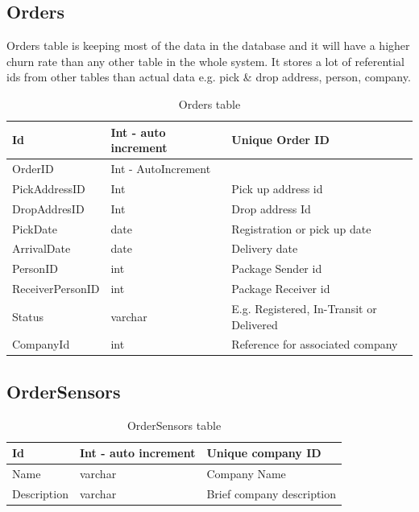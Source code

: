\subsection{Orders}
Orders table is keeping most of the data in the database and it will have a higher churn rate than any other table in the whole system. It stores a lot of referential ids from other tables than actual data e.g. pick \& drop address, person, company. 

\begin{table}[!ht]
\begin{center}
\begin{tabular}{ |l|l|l| } 
 \hline
Id & Int - auto increment & Unique Order ID \\
 \hline

OrderID & Int - AutoIncrement  & \\
\hline
PickAddressID & Int & Pick up address id\\
\hline
DropAddresID  & Int  & Drop address Id\\
\hline
PickDate  & date & Registration or pick up date\\
\hline
ArrivalDate & date & Delivery date\\
\hline
PersonID & int & Package Sender id\\
\hline
ReceiverPersonID & int & Package Receiver id\\
\hline
Status & varchar & E.g. Registered, In-Transit or Delivered\\
\hline
CompanyId & int & Reference for associated company\\

 \hline
\end{tabular}
\end{center}
    \caption{Orders table}
\end{table}

\subsection{OrderSensors}
\begin{table}[!ht]
\begin{center}
\begin{tabular}{ |l|l|l| } 
 \hline
Id & Int - auto increment & Unique company ID \\
 \hline
Name & varchar & Company Name \\
 \hline
Description & varchar & Brief company description \\
 \hline
\end{tabular}
\end{center}
    \caption{OrderSensors table}
\end{table}

